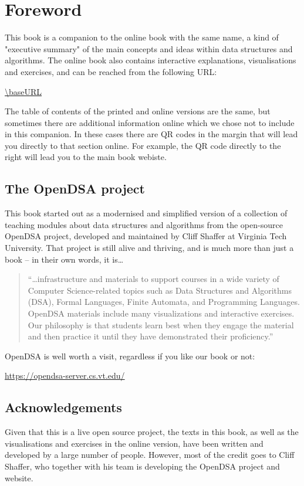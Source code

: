 \section*{Foreword}

This book is a companion to the online book with the same name, a kind of "executive summary" of the main concepts and ideas within data structures and algorithms.
The online book also contains interactive explanations, visualisations and exercises, and can be reached from the following URL:
\begin{center}
  \url{\baseURL}
\end{center}
The table of contents of the printed and online versions are the same, but sometimes there are additional information online which we chose not to include in this companion.
In these cases there are QR codes in the margin that will lead you directly to that section online.
For example, the QR code directly to the right will lead you to the main book webiste.


\subsection*{The OpenDSA project}

This book started out as a modernised and simplified version of a collection of teaching modules about data structures and algorithms from the open-source OpenDSA project, developed and maintained by Cliff Shaffer at Virginia Tech University.
That project is still alive and thriving, and is much more than just a book -- in their own words, it is\ldots

\begin{quotation}
  ``\ldots infrastructure and materials to support courses in a wide variety of Computer Science-related topics such as Data Structures and Algorithms (DSA), Formal Languages, Finite Automata, and Programming Languages.
  OpenDSA materials include many visualizations and interactive exercises. Our philosophy is that students learn best when they engage the material and then practice it until they have demonstrated their proficiency.''
\end{quotation}

OpenDSA is well worth a visit, regardless if you like our book or not:
\begin{center}
  \url{https://opendsa-server.cs.vt.edu/}
\end{center}

\subsection*{Acknowledgements}

Given that this is a live open source project, the texts in this book, as well as the visualisations and exercises in the online version, have been written and developed by a large number of people.
However, most of the credit goes to Cliff Shaffer, who together with his team is developing the OpenDSA project and website.

\newpage
